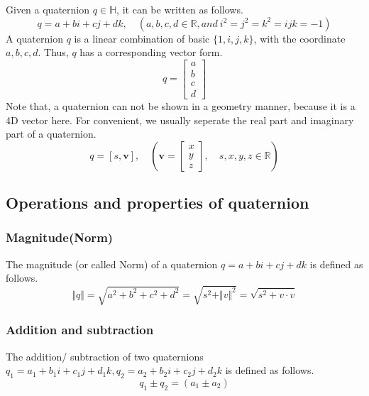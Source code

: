 \documentclass[runningheads,a4paper,english]{llncs}[2022/01/12]
\newcommand{\Clen}[1]{\Vert #1\Vert}
\newcommand{\bR}{\mathbb{R}}
\newcommand{\bH}{\mathbb{H}}
\newcommand{\bmatL}{\begin{bmatrix}}
\newcommand{\bmatR}{\end{bmatrix}}
\begin{document}
Given a quaternion $q\in \bH$, it can be written as follows.
\begin{equation}
  q=a+bi+cj+dk,\quad (a,b,c,d\in\bR, and~i^2=j^2=k^2=ijk=-1)
\end{equation}
A quaternion $q$ is a linear combination of basic $\{1,i,j,k\}$, with the coordinate $a,b,c,d$.
Thus, $q$ has a corresponding vector form.
\begin{equation}
  q=\bmatL a\\b\\c\\d \bmatR
\end{equation}
Note that, a quaternion can not be shown in a geometry manner, because it is a 4D vector here.
For convenient, we usually seperate the real part and imaginary part of a quaternion.
\begin{equation}
  q=[s,\mathbf{v}],\quad (\mathbf{v}=\bmatL x\\y\\z \bmatR,\quad s,x,y,z\in\bR)
\end{equation}

\subsection{Operations and properties of quaternion}
\subsubsection{Magnitude(Norm)}
The magnitude (or called Norm) of a quaternion $q=a+bi+cj+dk$ is defined as follows.
\begin{equation}
  \Clen{q}=\sqrt{a^2+b^2+c^2+d^2}=\sqrt{s^2+\Clen{v}^2}=\sqrt{s^2+v\cdot v}
\end{equation}

\subsubsection{Addition and subtraction}
\begin{definition}
  The addition/ subtraction of two quaternions $q_1=a_1+b_1i+c_1j+d_1k, q_2=a_2+b_2i+c_2j+d_2k$ is defined as follows.
  \begin{equation}
    q_1\pm q_2=(a_1\pm a_2)
  \end{equation}
\end{definition}



\end{document}
